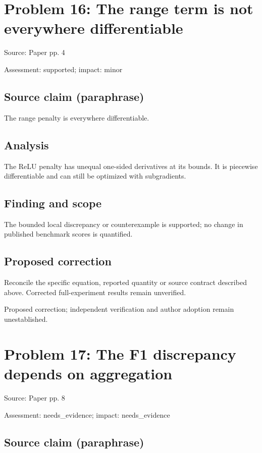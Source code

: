 \documentclass[11pt]{article}
\begin{document}
\section*{Problem 16: The range term is not everywhere differentiable}

Source: Paper pp. 4

Assessment: supported; impact: minor

\subsection*{Source claim (paraphrase)}

The range penalty is everywhere differentiable.

\subsection*{Analysis}

The ReLU penalty has unequal one-sided derivatives at its bounds. It is piecewise differentiable and can still be optimized with subgradients.

\subsection*{Finding and scope}

The bounded local discrepancy or counterexample is supported; no change in published benchmark scores is quantified.

\subsection*{Proposed correction}

Reconcile the specific equation, reported quantity or source contract described above. Corrected full-experiment results remain unverified.

Proposed correction; independent verification and author adoption remain unestablished.

\section*{Problem 17: The F1 discrepancy depends on aggregation}

Source: Paper pp. 8

Assessment: needs\_evidence; impact: needs\_evidence

\subsection*{Source claim (paraphrase)}
\end{document}
